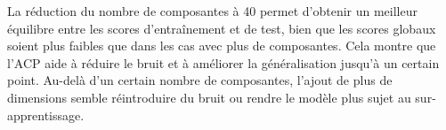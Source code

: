 \documentclass{scrartcl}
\begin{document}
La réduction du nombre de composantes à 40 permet d'obtenir un meilleur équilibre entre les scores d'entraînement et de test, bien que les scores globaux soient plus faibles que dans les cas avec plus de composantes. Cela montre que l'ACP aide à réduire le bruit et à améliorer la généralisation jusqu'à un certain point. Au-delà d'un certain nombre de composantes, l'ajout de plus de dimensions semble réintroduire du bruit ou rendre le modèle plus sujet au sur-apprentissage.
\end{document}
